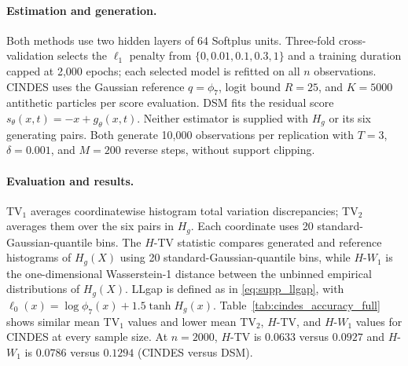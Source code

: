 \paragraph{Estimation and generation.}
Both methods use two hidden layers of 64 Softplus units. Three-fold
cross-validation selects the $\ell_1$ penalty from
$\{0,0.01,0.1,0.3,1\}$ and a training duration capped at 2,000 epochs;
each selected model is refitted on all $n$ observations. CINDES uses the
Gaussian reference $q=\phi_7$, logit bound $R=25$, and $K=5000$
antithetic particles per score evaluation. DSM fits the residual score
$s_\theta(x,t)=-x+g_\theta(x,t)$. Neither estimator is supplied with
$H_g$ or its six generating pairs. Both generate 10,000 observations per
replication with $T=3$, $\delta=0.001$, and $M=200$ reverse steps, without
support clipping.

\paragraph{Evaluation and results.}
TV$_1$ averages coordinatewise histogram total variation discrepancies;
TV$_2$ averages them over the six pairs in $H_g$. Each coordinate uses 20
standard-Gaussian-quantile bins. The $H$-TV statistic compares generated
and reference histograms of $H_g(X)$ using 20 standard-Gaussian-quantile
bins, while $H$-$W_1$ is the one-dimensional Wasserstein-1 distance between
the unbinned empirical distributions of $H_g(X)$. LLgap is defined as in
\eqref{eq:supp_llgap}, with $\ell_0(x)=\log\phi_7(x)+1.5\tanh H_g(x)$.
Table~\ref{tab:cindes_accuracy_full} shows similar mean TV$_1$ values
and lower mean TV$_2$, $H$-TV, and $H$-$W_1$ values for CINDES at every
sample size. At $n=2000$, $H$-TV is $0.0633$ versus $0.0927$ and
$H$-$W_1$ is $0.0786$ versus $0.1294$ (CINDES versus DSM).

